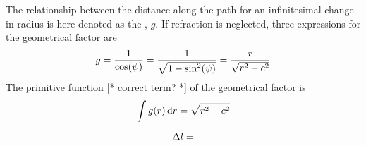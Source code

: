 The relationship between the distance along the path for an
infinitesimal change in radius is here denoted as the
, $g$. If refraction is neglected, three
expressions for the geometrical factor are
\begin{equation}
  g = \frac{1}{\cos(\psi)} = \frac{1}{\sqrt{1-\sin^2(\psi)}}
                                            = \frac{r}{\sqrt{r^2-c^2}}
  \label{eq:ppath:geomfac}
\end{equation}
The primitive function [* correct term? *] of the geometrical factor is
\begin{equation}
  \int{g(\ensuremath{r})}\,\mathrm{d} r = \sqrt{r^2-c^2}
  \label{eq:ppath:primofg}
\end{equation}


\begin{equation}
  \Delta l = 
  \label{eq:ppath:}
\end{equation}



\label{sec:ppath:1D}


\label{sec:ppath:1Dwithout}


\label{sec:ppath:1Dwith}



\label{sec:ppath:2D}


\label{sec:ppath:2Dwithout}


\label{sec:ppath:2Dwith}



\label{sec:ppath:3D}


\label{sec:ppath:3Dwithout}


\label{sec:ppath:3Dwith}



\label{sec:ppath:cfile}





